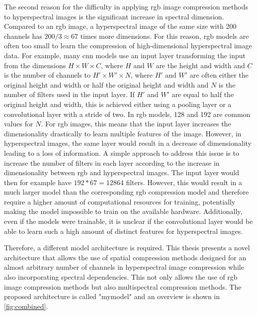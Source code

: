 The second reason for the difficulty in applying \ac{rgb} image compression methods to hyperspectral images is the significant increase in spectral dimension. Compared to an \ac{rgb} image, a hyperspectral image of the same size with 200 channels has $200/3 \approx 67$ times more dimensions. For this reason, \ac{rgb} models are often too small to learn the compression of high-dimensional hyperspectral image data. For example, many \ac{cnn} models use an input layer transforming the input from the dimensions $H \times W \times C$, where $H$ and $W$ are the height and width and $C$ is the number of channels to $H' \times W' \times N$, where $H'$ and $W'$ are often either the original height and width or half the original height and width and $N$ is the number of filters used in the input layer. If $H'$ and $W'$ are equal to half the original height and width, this is achieved either using a pooling layer or a convolutional layer with a stride of two. In \ac{rgb} models, 128 and 192 are common values for $N$. For \ac{rgb} images, this means that the input layer increases the dimensionality drastically to learn multiple features of the image. However, in hyperspectral images, the same layer would result in a decrease of dimensionality leading to a loss of information. A simple approach to address this issue is to increase the number of filters in each layer according to the increase in dimensionality between \ac{rgb} and hyperspectral images. The input layer would then for example have $192 * 67 = 12864$ filters. However, this would result in a much larger model than the corresponding \ac{rgb} compression model and therefore require a higher amount of computational resources for training, potentially making the model impossible to train on the available hardware. Additionally, even if the models were trainable, it is unclear if the convolutional layer would be able to learn such a high amount of distinct features for hyperspectral images.

Therefore, a different model architecture is required. This thesis presents a novel architecture that allows the use of spatial compression methods designed for an almost arbitrary number of channels in hyperspectral image compression while also incorporating spectral dependencies. This not only allows the use of \ac{rgb} image compression methods but also multispectral compression methods. The proposed architecture is called "\ac{mymodel}" and an overview is shown in \autoref{fig:combined}.
